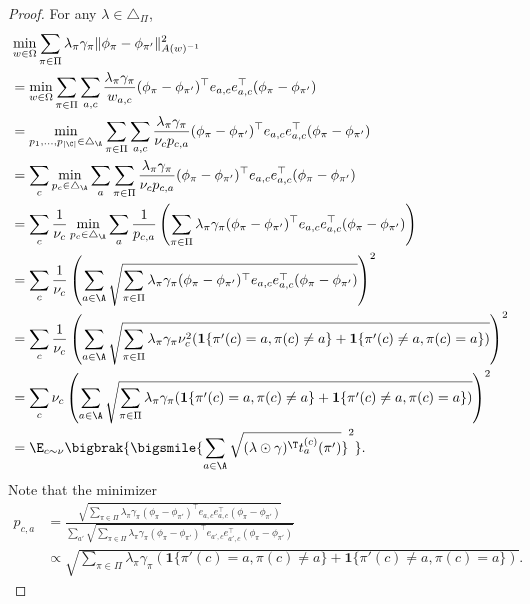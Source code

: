 \documentclass{article}
\newcommand{\1}{\mathbf{1}}
\begin{document}
\begin{proof}
For any $\lambda\in\triangle_\Pi$, 
\begin{align*}
    &\min_{w\in\Omega}\sum_{\pi\in \Pi} \lambda_{\pi}\gamma_\pi\|\phi_{\pi}-\phi_{\pi'}\|_{A(w)^{-1}}^2\\
    &= \min_{w\in\Omega}\sum_{\pi \in \Pi} \sum_{a,c} \frac{\lambda_{\pi}\gamma_\pi}{w_{a,c}} (\phi_{\pi}-\phi_{\pi'})^\top e_{a,c}e_{a,c}^{\top} (\phi_{\pi}-\phi_{\pi'})\\
    &= \min_{p_1,\dots,p_{|\C|} \in \triangle_\A} \sum_{\pi \in \Pi} \sum_{a,c} \frac{\lambda_{\pi}\gamma_\pi}{\nu_c p_{c,a}} (\phi_{\pi}-\phi_{\pi'})^\top e_{a,c}e_{a,c}^{\top} (\phi_{\pi}-\phi_{\pi'})   \\
    &=  \sum_c  \min_{p_c \in \triangle_\A}  \sum_a\sum_{\pi \in \Pi}  \frac{\lambda_{\pi}\gamma_\pi}{\nu_c p_{c,a}} (\phi_{\pi}-\phi_{\pi'})^\top e_{a,c}e_{a,c}^{\top} (\phi_{\pi}-\phi_{\pi'})   \\
    &=  \sum_c \frac{1}{\nu_c} \min_{p_c \in \triangle_\A}  \sum_a  \frac{1}{p_{c,a}}  \left( \sum_{\pi \in \Pi} \lambda_{\pi}\gamma_\pi (\phi_{\pi}-\phi_{\pi'})^\top e_{a,c}e_{a,c}^{\top} (\phi_{\pi}-\phi_{\pi'}) \right) \\
    &=  \sum_c \frac{1}{\nu_c}  \left( \sum_{a\in\A} \sqrt{ \sum_{\pi \in \Pi} \lambda_{\pi}\gamma_\pi (\phi_{\pi}-\phi_{\pi'})^\top e_{a,c}e_{a,c}^{\top} (\phi_{\pi}-\phi_{\pi'}) } \right)^2  \\
    &=  \sum_c \frac{1}{\nu_c}  \left( \sum_{a\in\A} \sqrt{ \sum_{\pi \in \Pi} \lambda_{\pi}\gamma_\pi \nu_c^2 (\1\{ \pi'(c) = a, \pi(c) \neq a \} + \1\{ \pi'(c) \neq a, \pi(c) = a \})} \right)^2  \\
    &= \sum_c \nu_c  \left( \sum_{a\in\A} \sqrt{ \sum_{\pi \in \Pi} \lambda_{\pi}\gamma_\pi (\1\{ \pi'(c) = a, \pi(c) \neq a \} + \1\{ \pi'(c) \neq a, \pi(c) = a \}) } \right)^2 \\
    &= \E_{c\sim\nu}\bigbrak{\bigsmile{\sum_{a\in\A}\sqrt{(\lambda\odot\gamma)^\T t_a^{(c)}(\pi')}}^2}.\\
\end{align*}
Note that the minimizer
\begin{align*}
    p_{c,a} &= \frac{\sqrt{ \sum_{\pi \in \Pi} \lambda_{\pi}\gamma_\pi (\phi_\pi-\phi_{\pi'})^\top e_{a,c}e_{a,c}^{\top} (\phi_\pi-\phi_{\pi'}) } }{\sum_{a'} \sqrt{ \sum_{\pi \in \Pi} \lambda_{\pi}\gamma_\pi (\phi_\pi-\phi_{\pi'})^\top e_{a',c}e_{a',c}^{\top} (\phi_\pi-\phi_{\pi'}) } } \\
    &\propto \sqrt{ \sum_{\pi \in \Pi} \lambda_\pi\gamma_\pi (\1\{ \pi'(c) = a, \pi(c) \neq a \} + \1\{ \pi'(c) \neq a, \pi(c) = a \}) }.
\end{align*}
\end{proof}
\end{document}
